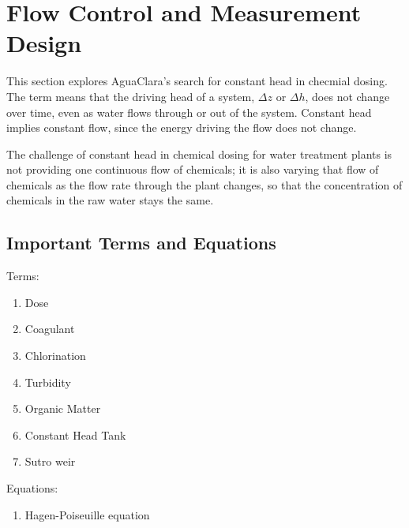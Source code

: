 \documentclass[letterpaper,10pt,english]{sphinxmanual}
\begin{document}
\chapter{Flow Control and Measurement Design}
\label{\detokenize{Flow_Control_and_Measurement/FCM_Design:flow-control-and-measurement-design}}\label{\detokenize{Flow_Control_and_Measurement/FCM_Design:flow-control-design}}\label{\detokenize{Flow_Control_and_Measurement/FCM_Design::doc}}
This section explores AguaClara’s search for constant head in checmial dosing. The term  means that the driving head of a system, \(\Delta z\) or \(\Delta h\), does not change over time, even as water flows through or out of the system. Constant head implies constant flow, since the energy driving the flow does not change.

The challenge of constant head in chemical dosing for water treatment plants is not  providing one continuous flow of chemicals; it is also varying that flow of chemicals as the flow rate through the plant changes, so that the concentration of chemicals in the raw water stays the same.


\section{Important Terms and Equations}
\label{\detokenize{Flow_Control_and_Measurement/FCM_Design:important-terms-and-equations}}\label{\detokenize{Flow_Control_and_Measurement/FCM_Design:fcm-terms-eqs}}
Terms:
\begin{enumerate}
\item {} 
Dose

\item {} 
Coagulant

\item {} 
Chlorination

\item {} 
Turbidity

\item {} 
Organic Matter

\item {} 
Constant Head Tank

\item {} 
Sutro weir

\end{enumerate}

Equations:
\begin{enumerate}
\item {} 
Hagen-Poiseuille equation

\end{enumerate}
\end{document}
